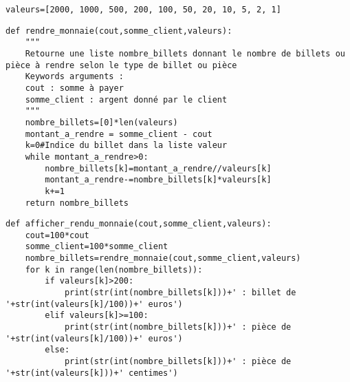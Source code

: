 \exer{}
\setcounter{numques}{0}

\question{}
\begin{lstlisting}
valeurs=[2000, 1000, 500, 200, 100, 50, 20, 10, 5, 2, 1]
\end{lstlisting}

\question{}

\begin{lstlisting}
def rendre_monnaie(cout,somme_client,valeurs):
    """
    Retourne une liste nombre_billets donnant le nombre de billets ou pièce à rendre selon le type de billet ou pièce
    Keywords arguments :
    cout : somme à payer
    somme_client : argent donné par le client
    """
    nombre_billets=[0]*len(valeurs)
    montant_a_rendre = somme_client - cout
    k=0#Indice du billet dans la liste valeur
    while montant_a_rendre>0:
        nombre_billets[k]=montant_a_rendre//valeurs[k]
        montant_a_rendre-=nombre_billets[k]*valeurs[k]
        k+=1
    return nombre_billets
\end{lstlisting}

\question{}

\begin{lstlisting}
def afficher_rendu_monnaie(cout,somme_client,valeurs):
    cout=100*cout
    somme_client=100*somme_client
    nombre_billets=rendre_monnaie(cout,somme_client,valeurs)
    for k in range(len(nombre_billets)):
        if valeurs[k]>200:
            print(str(int(nombre_billets[k]))+' : billet de '+str(int(valeurs[k]/100))+' euros')
        elif valeurs[k]>=100:
            print(str(int(nombre_billets[k]))+' : pièce de '+str(int(valeurs[k]/100))+' euros')
        else:
            print(str(int(nombre_billets[k]))+' : pièce de '+str(int(valeurs[k]))+' centimes')
\end{lstlisting}